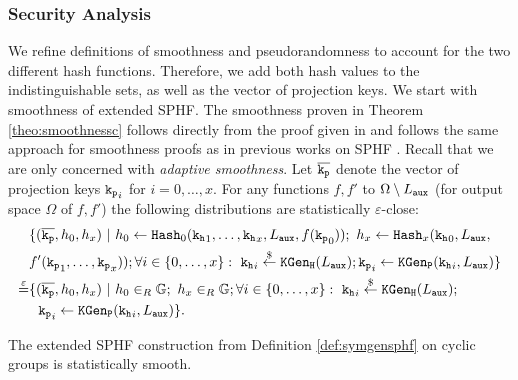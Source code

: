 \subsubsection{Security Analysis}
We refine definitions of smoothness and pseudorandomness to account for the two different hash functions.
Therefore, we add both hash values to the indistinguishable sets, as well as the vector of projection keys.
We start with smoothness of extended \ac{SPHF}.
The smoothness proven in Theorem \ref{theo:smoothnessc} follows directly from the proof given in \cite[Appendix D.3]{cryptoeprint:2013:034} and follows the same approach for smoothness proofs as in previous works on \ac{SPHF} \cite{cryptoeprint:2013:034,Gennaro2003,Katz2011}.
Recall that we are only concerned with \emph{adaptive smoothness}.
Let $\overline{\mathtt{k_p}}$ denote the vector of projection keys $\mathtt{k_p}_i$ for $i=0,\dots,x$.
For any functions $f,f'$ to $\Omega\setminus L_\mathtt{aux}$ (for output space $\Omega$ of $f,f'$) the following distributions are statistically $\varepsilon$-close:
\begin{align*}
& \{(\overline{\mathtt{k_p}},h_0,h_x) ~|~ h_0\gets\mathtt{Hash}_0(\mathtt{k_h}_1,\dots,\mathtt{k_h}_x,L_\mathtt{aux},f(\mathtt{k_p}_0));~ h_x\gets\mathtt{Hash}_x(\mathtt{k_h}_0,L_\mathtt{aux}, \\
& f'(\mathtt{k_p}_1,\dots,\mathtt{k_p}_x)); \forall i\in\{0,\dots,x\}:~ \mathtt{k_h}_i\stackrel{\$}{\gets}\mathtt{KGen_H}(L_\mathtt{aux}); \mathtt{k_p}_i\gets\mathtt{KGen_P}(\mathtt{k_h}_i,L_\mathtt{aux})\} \\
\stackrel{\varepsilon}{=} & \{(\overline{\mathtt{k_p}},h_0,h_x) ~|~ h_0\in_R\mathbb{G};~ h_x\in_R\mathbb{G}; \forall i\in\{0,\dots,x\}:~ \mathtt{k_h}_i\stackrel{\$}{\gets}\mathtt{KGen_H}(L_\mathtt{aux}); \\
& ~~\mathtt{k_p}_i\gets\mathtt{KGen_P}(\mathtt{k_h}_i,L_\mathtt{aux})\}.
\end{align*}

\begin{theorem}\label{theo:smoothnessc}
The extended \ac{SPHF} construction from Definition \ref{def:symgensphf} on cyclic groups is statistically smooth.
\end{theorem}

